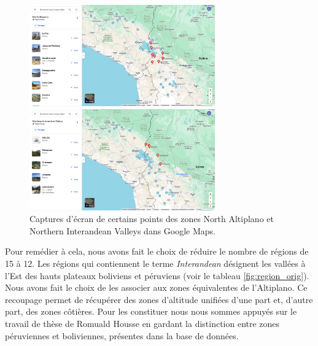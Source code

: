    \begin{figure}[!h]
    \begin{minipage}[c]{.5\linewidth}
            \begin{center}
                \includegraphics[width=8cm]{../images/GM_NorthAltiplano.png}
            \end{center}
    \end{minipage}
        \begin{minipage}[c]{.5\linewidth}
        \begin{center}
        		\includegraphics[width=8cm]{../images/GM_NorthernInterandeanValleys.png}
	\end{center}
    \end{minipage}
    	\caption{Captures d'écran de certains points des zones \og North Altiplano \fg \:et \og Northern Interandean Valleys \fg dans Google Maps.}
	\label{fig:GM}   
\end{figure}

Pour remédier à cela, nous avons fait le choix de réduire le nombre de régions de 15 à 12. Les régions qui contiennent le terme \og \textit{Interandean} \fg \:désignent les vallées à l'Est des hauts plateaux boliviens et péruviens (voir le tableau \ref{fig:region_orig}). Nous avons fait le choix de les associer aux zones équivalentes de l'Altiplano. Ce recoupage permet de récupérer des zones d'altitude unifiées d'une part et, d'autre part, des zones côtières. Pour les constituer nous nous sommes appuyés sur le travail de thèse de Romuald Housse en gardant la distinction entre zones péruviennes et boliviennes, présentes dans la base de données. 
 
